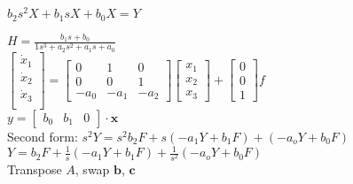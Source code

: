 \documentclass[4pt]{article}
\theoremstyle{definition}
\theoremstyle{definition}
\begin{document}
\begin{multicols}{3}
    \(b_2 s^2 X + b_1 sX + b_0 X = Y\)


    \(H = \frac{b_1s+b_0}{1s^3+a_2s^2+a_1s+a_0}\)\\     %

    \(
    \begin{bmatrix}
        \dot{x}_1\\
        \dot{x}_2\\
        \dot{x}_3\\
    \end{bmatrix}
    =
    \begin{bmatrix}
        0 & 1 & 0\\
        0 & 0 & 1\\
        -a_0 & -a_1 & -a_2      %
    \end{bmatrix}
    \begin{bmatrix}
        x_1\\
        x_2\\
        x_3
    \end{bmatrix}
    +
    \begin{bmatrix}
        0\\0\\1         %
    \end{bmatrix}
    f
    \)\\

    \(y =
    \begin{bmatrix}
        b_0 & b_1 & 0      %
    \end{bmatrix}
    \cdot \mathbf x
    \)\\
    Second form: \(s^2 Y = s^2 b_2 F + s(-a_1 Y + b_1 F) + (-a_o Y + b_0 F)\)\\
    \(Y = b_2 F + \frac 1 s(-a_1 Y + b_1 F) + \frac 1 {s^2}(-a_o Y + b_0 F)\)\\
    Transpose $A$, swap $\mathbf b$, $\mathbf c$




\end{multicols}
\end{document}
